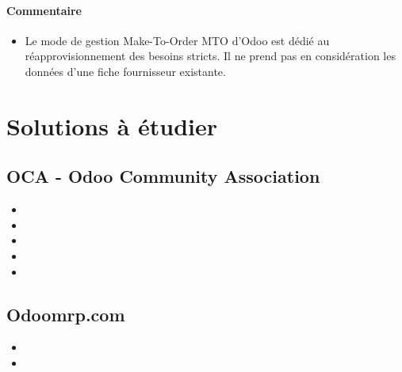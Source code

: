 \documentclass[letterpaper,10pt,french]{sphinxmanual}
\begin{document}
\subsubsection{Commentaire}
\label{\detokenize{readthedocs/tests/C1_MPS:commentaire}}\begin{itemize}
\item {} 
Le mode de gestion Make-To-Order MTO d’Odoo est dédié au réapprovisionnement des besoins stricts. Il ne prend pas en considération les données d’une fiche fournisseur existante.

\end{itemize}


\chapter{Solutions à étudier}
\label{\detokenize{readthedocs/solutions:solutions-a-etudier}}\label{\detokenize{readthedocs/solutions::doc}}

\section{OCA - Odoo Community Association}
\label{\detokenize{readthedocs/solutions:id1}}\begin{itemize}
\item {} 

\item {} 

\item {} 

\item {} 

\item {} 

\end{itemize}


\section{Odoomrp.com}
\label{\detokenize{readthedocs/solutions:id2}}\begin{itemize}
\item {} 

\item {} 

\end{itemize}
\end{document}
